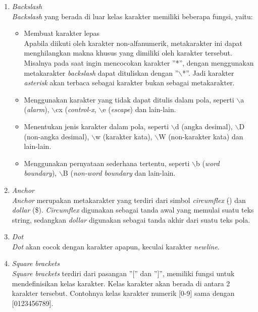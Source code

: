 \begin{enumerate}
	\item \textit{Backslash} \\
	\textit{Backslash} yang berada di luar kelas karakter memiliki beberapa fungsi, yaitu:
	\begin{itemize}
		\item Membuat karakter lepas\\
		Apabila diikuti oleh karakter non-alfanumerik, metakarakter ini dapat menghilangkan makna khusus yang dimiliki oleh karakter tersebut. Misalnya pada saat ingin mencocokan karakter ''*'', dengan menggunakan metakarakter \textit{backslash} dapat dituliskan dengan ''$\backslash$*''. Jadi karakter \textit{asterisk} akan terbaca sebagai karakter bukan sebagai metakarakter.
				
		\item Menggunakan karakter yang tidak dapat ditulis dalam pola, seperti $\backslash$a (\textit{alarm}), $\backslash$cx (\textit{control-x}, $\backslash$e (\textit{escape}) dan lain-lain.
		
		\item Menentukan jenis karakter dalam pola, seperti $\backslash$d (angka desimal), $\backslash$D (non-angka desimal), $\backslash$w (karakter kata), $\backslash$W (non-karakter kata) dan lain-lain.
		
		\item Menggunakan pernyataan sederhana tertentu, seperti $\backslash$b (\textit{word boundary}), $\backslash$B (\textit{non-word boundary} dan lain-lain.
		
	\end{itemize}
	
	\item \textit{Anchor}\\
	\textit{Anchor} merupakan metakarakter yang terdiri dari simbol \textit{circumflex} ($\hat{}$) dan \textit{dollar} (\$). \textit{Circumflex} digunakan sebagai tanda awal yang memulai suatu teks string, sedangkan \textit{dollar} digunakan sebagai tanda akhir dari suatu teks pola.
	
	\item \textit{Dot} \\
	\textit{Dot} akan cocok dengan karakter apapun, keculai karakter \textit{newline}.
	
	\item \textit{Square brackets} \\
	\textit{Square brackets} terdiri dari pasangan ''['' dan '']'', memiliki fungsi untuk mendefinisikan kelas karakter. Kelas karakter akan berada di antara 2 karakter tersebut.	Contohnya kelas karakter numerik [0-9] sama dengan [0123456789].
	

\end{enumerate}
